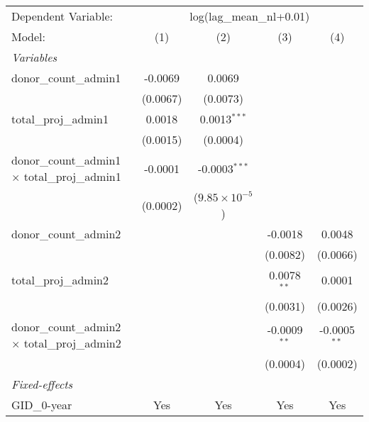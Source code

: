 \begingroup
\centering
\begin{tabular}{lcccc}
   \tabularnewline \midrule \midrule
   Dependent Variable: & \multicolumn{4}{c}{log(lag\_mean\_nl+0.01)}\\
   Model:                                                 & (1)      & (2)                     & (3)            & (4)\\  
   \midrule
   \emph{Variables}\\
   donor\_count\_admin1                                   & -0.0069  & 0.0069                  &                &   \\   
                                                          & (0.0067) & (0.0073)                &                &   \\   
   total\_proj\_admin1                                    & 0.0018   & 0.0013$^{***}$          &                &   \\   
                                                          & (0.0015) & (0.0004)                &                &   \\   
   donor\_count\_admin1 $\times$ total\_proj\_admin1      & -0.0001  & -0.0003$^{***}$         &                &   \\   
                                                          & (0.0002) & ($9.85\times 10^{-5}$)  &                &   \\   
   donor\_count\_admin2                                   &          &                         & -0.0018        & 0.0048\\   
                                                          &          &                         & (0.0082)       & (0.0066)\\   
   total\_proj\_admin2                                    &          &                         & 0.0078$^{**}$  & 0.0001\\   
                                                          &          &                         & (0.0031)       & (0.0026)\\   
   donor\_count\_admin2 $\times$ total\_proj\_admin2      &          &                         & -0.0009$^{**}$ & -0.0005$^{**}$\\   
                                                          &          &                         & (0.0004)       & (0.0002)\\   
   \midrule
   \emph{Fixed-effects}\\
   GID\_0-year                                            & Yes      & Yes                     & Yes            & Yes\\  

\end{tabular}
